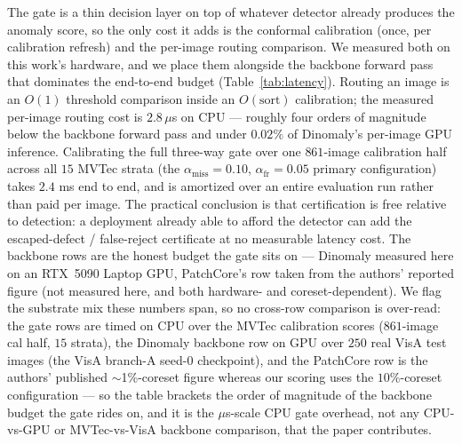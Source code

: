 \documentclass[preprint,11pt]{elsarticle}
\begin{document}
The gate is a thin decision layer on top of whatever detector already produces the anomaly score,
so the only cost it adds is the conformal calibration (once, per calibration refresh) and the
per-image routing comparison. We measured both on this work's hardware, and we place them
alongside the backbone forward pass that dominates the end-to-end budget
(Table~\ref{tab:latency}). Routing an image is an $O(1)$ threshold comparison inside an
$O(\text{sort})$ calibration; the measured per-image routing cost is $2.8\,\mu$s on CPU ---
roughly four orders of magnitude below the backbone forward pass and under $0.02\%$ of Dinomaly's
per-image GPU inference. Calibrating the full three-way gate over one $861$-image calibration half
across all $15$ MVTec strata (the $\alpha_{\text{miss}}=0.10$, $\alpha_{\text{fr}}=0.05$ primary
configuration) takes $2.4$ ms end to end, and is amortized over an entire evaluation run rather
than paid per image. The practical conclusion is that certification is free relative to detection:
a deployment already able to afford the detector can add the escaped-defect / false-reject
certificate at no measurable latency cost. The backbone rows are the honest budget the gate sits
on --- Dinomaly measured here on an RTX~5090 Laptop GPU, PatchCore's row taken from the authors'
reported figure (not measured here, and both hardware- and coreset-dependent). We flag the
substrate mix these numbers span, so no cross-row comparison is over-read: the gate rows are timed
on CPU over the MVTec calibration scores ($861$-image cal half, $15$ strata), the Dinomaly backbone
row on GPU over $250$ real VisA test images (the VisA branch-A seed-$0$ checkpoint), and the
PatchCore row is the authors' published $\sim$1\%-coreset figure whereas our scoring uses the
$10\%$-coreset configuration --- so the table brackets the order of magnitude of the
backbone budget the gate rides on, and it is the $\mu$s-scale CPU gate overhead, not any
CPU-vs-GPU or MVTec-vs-VisA backbone comparison, that the paper contributes.
\end{document}

